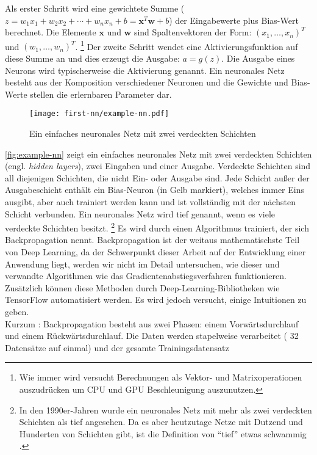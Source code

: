 \noindent
Als erster Schritt wird eine gewichtete Summe
($z = w_1x_1 + w_2x_2 +\dotsb+ w_nx_n + b = \mathbf{x}^T\mathbf{w} + b$)
der Eingabewerte plus Bias-Wert berechnet. Die Elemente $\mathbf{x}$ und $\mathbf{w}$
sind Spaltenvektoren der Form: $(x_1,\dotsc,x_n)^T$ und $(w_1,\dotsc,w_n)^T$.
\footnote{Wie immer wird versucht Berechnungen als Vektor- und Matrixoperationen
auszudrücken um CPU und GPU Beschleunigung auszunutzen.}
Der zweite Schritt wendet eine Aktivierungsfunktion auf diese Summe an und dies
erzeugt die Ausgabe: $a = g(z)$. Die Ausgabe eines Neurons
wird typischerweise die Aktivierung genannt. Ein neuronales Netz
besteht aus der Komposition verschiedener Neuronen und die
Gewichte und Bias-Werte stellen die erlernbaren Parameter dar.
\begin{figure}[h!]
  \centering
  \texttt{[image: first-nn/example-nn.pdf]}
  \caption{Ein einfaches neuronales Netz mit zwei verdeckten Schichten}
  \label{fig:example-nn}
\end{figure}
\noindent
\autoref{fig:example-nn} zeigt ein einfaches neuronales Netz
mit zwei verdeckten Schichten (engl. \textit{hidden layers}),
zwei Eingaben und einer Ausgabe.
Verdeckte Schichten sind all diejenigen Schichten, die nicht Ein- oder Ausgabe sind.
Jede Schicht außer der Ausgabeschicht enthält ein Bias-Neuron
(in Gelb markiert), welches immer Eins ausgibt, aber auch trainiert werden kann
und ist vollständig mit der nächsten Schicht verbunden.
Ein neuronales Netz wird tief genannt, wenn es viele verdeckte Schichten besitzt.
\footnote{In den 1990er-Jahren wurde ein neuronales Netz
mit mehr als zwei verdeckten Schichten als tief angesehen.
Da es aber heutzutage Netze mit Dutzend und Hunderten von Schichten
gibt, ist die Definition von \enquote{tief} etwas schwammig \parencite[289]{book:hands-on-ml}.}
Es wird durch einen Algorithmus trainiert, der
sich Backpropagation nennt.
Backpropagation ist der weitaus mathematischste Teil von
Deep Learning, da der Schwerpunkt dieser Arbeit auf der Entwicklung einer
Anwendung liegt, werden wir nicht im Detail untersuchen,
wie dieser und verwandte Algorithmen wie das Gradientenabstiegsverfahren
funktionieren. Zusätzlich können diese Methoden durch Deep-Learning-Bibliotheken
wie TensorFlow automatisiert werden. Es wird jedoch versucht, einige
Intuitionen zu geben.\\[8pt]
Kurzum \parencite[290-291]{book:hands-on-ml}:
Backpropagation besteht aus zwei Phasen: einem Vorwärtsdurchlauf
und einem Rückwärtsdurchlauf. Die Daten werden stapelweise verarbeitet
(\zB{} 32 Datensätze auf ein­mal) und der gesamte Trainingsdatensatz
